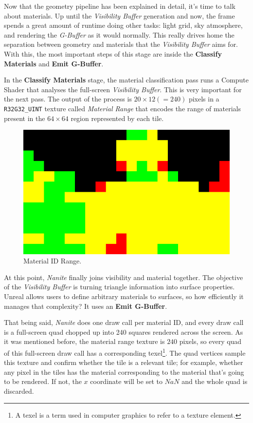 \documentclass[10pt,journal,compsoc]{IEEEtran}
\begin{document}
\par Now that the geometry pipeline has been explained in detail, it's time to talk about materials. Up until the \textit{Visibility Buffer} generation and now, the frame spends a great amount of runtime doing other tasks: light grid, sky atmosphere, and rendering the \textit{G-Buffer} as it would normally. This really drives home the separation between geometry and materials that the \textit{Visibility Buffer} aims for. With this, the most important steps of this stage are inside the \textbf{Classify Materials} and \textbf{Emit G-Buffer}.

\par In the \textbf{Classify Materials} stage, the material classification pass runs a Compute Shader that analyses the full-screen \textit{Visibility Buffer}. This is very important for the next pass. The output of the process is $20\times12 (=240)$ pixels in a \texttt{R32G32\_UINT} texture called \textit{Material Range} that encodes the range of materials present in the $64\times64$ region represented by each tile.

\begin{figure}[H]
    \centering
    \includegraphics[scale=0.52]{img/cm.png}
    \caption{Material ID Range\cite{IGN}.}
    \label{fig:mir}
\end{figure}

\par At this point, \textit{Nanite} finally joins visibility and material together. The objective of the \textit{Visibility Buffer} is turning triangle information into surface properties. Unreal allows users to define arbitrary materials to surfaces, so how efficiently it manages that complexity? It uses an \textbf{Emit G-Buffer}.

\par That being said, \textit{Nanite} does one draw call per material ID, and every draw call is a full-screen quad chopped up into 240 squares rendered across the screen. As it was mentioned before, the material range texture is $240$ pixels, so every quad of this full-screen draw call has a corresponding texel\footnote{A texel is a term used in computer graphics to refer to a texture element.}. The quad vertices sample this texture and confirm whether the tile is a relevant tile; for example, whether any pixel in the tiles has the material corresponding to the material that's going to be rendered. If not, the $x$ coordinate will be set to $NaN$ and the whole quad is discarded.
\end{document}
